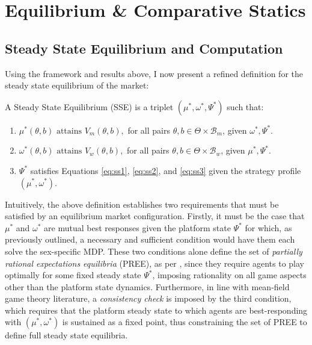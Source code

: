 \section{Equilibrium \& Comparative Statics}
\label{sec:section3} 
\subsection{Steady State Equilibrium and Computation}\label{sec:section3.1} 
Using the framework and results above, I now present a refined definition for the steady state equilibrium of the market: 
\begin{definition}
    A Steady State Equilibrium (SSE) is a triplet $(\mu^*, \omega^*, \Psi^*)$ such that:
    \begin{enumerate}
        \item $ \mu^*(\theta,b) \text{ attains } V_m(\theta,b),$ for all pairs $\theta, b \in \Theta \times \mathcal{B}_m$, given $\omega^*,\Psi^*$.
        \item $ \omega^*(\theta,b) \text{ attains } V_w(\theta,b),$ for all pairs $\theta, b \in \Theta \times \mathcal{B}_w$, given $\mu^*,\Psi^*$.
        \item $\Psi^*$ satisfies Equations \ref{eq:ss1}, \ref{eq:ss2}, and \ref{eq:ss3} given the strategy profile $(\mu^*, \omega^*)$.
    \end{enumerate} 
\end{definition}

Intuitively, the above definition establishes two requirements that must be satisfied by an equilibrium market configuration. 
Firstly, it must be the case that $\mu^*$ and $\omega^*$ are mutual best responses given the platform state $\Psi^*$ for which, as previously outlined, a necessary and sufficient condition would have them each solve the sex-specific MDP. 
These two conditions alone define the set of \textit{partially rational expectations equilibria} (PREE), as per \cite{burdett1997marriage}, since they require agents to play optimally for some fixed steady state $\Psi^*$, imposing rationality on all game aspects other than the platform state dynamics.  
Furthermore, in line with mean-field game theory literature, a \textit{consistency check} is imposed by the third condition, which requires that the platform steady state to which agents are best-responding with $(\mu^*,\omega^*)$ is sustained as a fixed point, thus constraining the set of PREE to define full steady state equilibria. 

